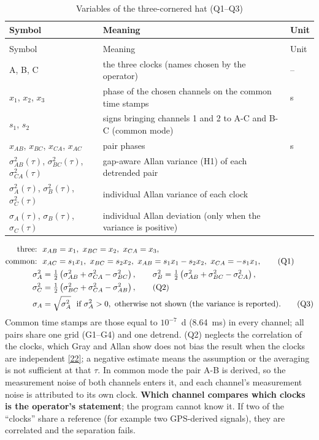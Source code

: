 \documentclass[11pt,a4paper]{article}
\makeatletter
\newcommand{\grayallan}{\href{https://tf.nist.gov/general/pdf/57.pdf}{[22]}}
\renewcommand{\_}{\usscore\allowbreak}
\newenvironment{vartable}[2]{%
 \par\small\setlength{\LTpre}{3pt}\setlength{\LTpost}{3pt}%
 \begin{longtable}{@{}>{\raggedright}p{.2\linewidth}>{\raggedright}p{.57\linewidth}>{\raggedright\arraybackslash}p{.17\linewidth}@{}}
 \caption{#2}\label{#1}\\
 \toprule Symbol & Meaning & Unit\\\midrule
 \endfirsthead
 \multicolumn{3}{@{}l}{\footnotesize\itshape Table \thetable{} (continued)}\\
 \toprule Symbol & Meaning & Unit\\\midrule
 \endhead
 \bottomrule
 \endlastfoot}
 {\end{longtable}\normalsize}
\makeatother
\begin{document}
\begin{vartable}{tab:var-Q}{Variables of the three-cornered hat (Q1--Q3)}
A, B, C & the three clocks (names chosen by the operator) & --\\
\(x_1\), \(x_2\), \(x_3\) & phase of the chosen channels on the common time stamps & s\\
\(s_1\), \(s_2\) & signs bringing channels 1 and 2 to A-C and B-C (common mode) & 1\\
\(x_{AB}\), \(x_{BC}\), \(x_{CA}\), \(x_{AC}\) & pair phases & s\\
\(\sigma^2_{AB}(\tau)\), \(\sigma^2_{BC}(\tau)\), \(\sigma^2_{CA}(\tau)\) & gap-aware Allan variance (H1) of each detrended pair & 1\\
\(\sigma^2_A(\tau)\), \(\sigma^2_B(\tau)\), \(\sigma^2_C(\tau)\) & individual Allan variance of each clock & 1\\
\(\sigma_A(\tau)\), \(\sigma_B(\tau)\), \(\sigma_C(\tau)\) & individual Allan deviation (only when the variance is positive) & 1\\
\end{vartable}
\begin{align}
\text{three:}\ \ &x_{AB}=x_1,\ x_{BC}=x_2,\ x_{CA}=x_3, \notag\\
\text{common:}\ \ &x_{AC}=s_1x_1,\ x_{BC}=s_2x_2,\ x_{AB}=s_1x_1-s_2x_2,\ x_{CA}=-s_1x_1, \tag{Q1}\label{eq:Q1}\\
\sigma^2_A&=\tfrac12\left(\sigma^2_{AB}+\sigma^2_{CA}-\sigma^2_{BC}\right),\qquad
\sigma^2_B=\tfrac12\left(\sigma^2_{AB}+\sigma^2_{BC}-\sigma^2_{CA}\right), \notag\\
\sigma^2_C&=\tfrac12\left(\sigma^2_{BC}+\sigma^2_{CA}-\sigma^2_{AB}\right), \tag{Q2}\label{eq:Q2}\\
\sigma_A&=\sqrt{\sigma^2_A}\ \ \text{if}\ \sigma^2_A>0,\ \text{otherwise not shown (the variance is reported)}. \tag{Q3}\label{eq:Q3}
\end{align}
Common time stamps are those equal to \(10^{-7}\)~d (8.64~ms) in every channel; all pairs share one
grid (G1--G4) and one detrend. (Q2) neglects the correlation of the clocks, which Gray and Allan show
does not bias the result when the clocks are independent \grayallan; a negative estimate means the
assumption or the averaging is not sufficient at that \(\tau\). In common mode the pair A-B is
derived, so the measurement noise of both channels enters it, and each channel's measurement noise is
attributed to its own clock. \textbf{Which channel compares which clocks is the operator's statement};
the program cannot know it. If two of the ``clocks'' share a reference (for example two GPS-derived
signals), they are correlated and the separation fails.
\end{document}
